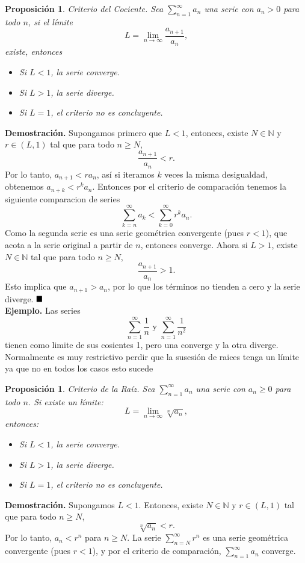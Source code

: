 \documentclass[letterpaper]{book}
\newtheorem{prop}[teorema]{Proposici\'on}
\newcommand{\eje}{{\noindent \sc \textbf{Ejemplo. }}}
\newcommand{\dem}{{\noindent \sc \textbf{Demostraci\'on. }}}
\newcommand{\QED}{\ensuremath{\hspace*{0em plus 1fill}\blacksquare}}
\begin{document}
\begin{prop}{Criterio del Cociente.}
Sea \(\sum_{n=1}^\infty a_n\) una serie con \(a_n > 0\) para todo \(n\), si el límite
\[
L = \lim_{n \to \infty} \frac{a_{n+1}}{a_n},
\]
existe, entonces
\begin{itemize}
\item Si \(L < 1\), la serie converge.
\item Si \(L > 1\), la serie diverge.
\item Si \(L = 1\), el criterio no es concluyente.
\end{itemize}
\end{prop}
\dem Supongamos primero que \(L < 1\), entonces, existe \(N \in \mathbb{N}\) y \(r \in (L, 1)\) tal que para todo \(n \geq N\),
\[
\frac{a_{n+1}}{a_n} < r.
\]
Por lo tanto, \(a_{n+1} < r a_n\), así si iteramos \(k\) veces la misma desigualdad, obtenemos \(a_{n+k} < r^k a_n\).
Entonces por el criterio de comparación tenemos la siguiente  comparacion de series
\[
    \sum_{k=n}^\infty a_k<\sum_{k=0}^\infty r^k a_n.
    \]
Como la segunda serie es una serie geométrica convergente (pues \(r < 1\)), que acota a la serie original a partir de \(n\), entonces converge.
Ahora si \(L > 1\), existe \(N \in \mathbb{N}\) tal que para todo \(n \geq N\),
\[
\frac{a_{n+1}}{a_n} > 1.
\]
Esto implica que \(a_{n+1} > a_n\), por lo que los términos no tienden a cero y la serie diverge.
\QED\\
\eje Las series
\[
\sum_{n=1}^{\infty}\frac{1}{n}\text{ y }\sum_{n=1}^{\infty}\frac{1}{n^2}
\]
tienen como limite de sus cosientes 1, pero una converge y la otra diverge.
Normalmente es muy restrictivo perdir que la susesión de raices tenga un límite ya que no en todos los casos esto sucede
\begin{prop}{Criterio de la Raíz.}
Sea \(\sum_{n=1}^\infty a_n\) una serie con \(a_n \geq 0\) para todo \(n\). Si existe un límite:
\[
L = \lim_{n \to \infty} \sqrt[n]{a_n},
\]
entonces:
\begin{itemize}
    \item Si \(L < 1\), la serie converge.
    \item Si \(L > 1\), la serie diverge.
    \item Si \(L = 1\), el criterio no es concluyente.
\end{itemize}
\end{prop}
\dem Supongamos \(L < 1\). Entonces, existe \(N \in \mathbb{N}\) y \(r \in (L, 1)\) tal que para todo \(n \geq N\),
\[
\sqrt[n]{a_n} < r.
\]
Por lo tanto, \(a_n < r^n\) para \(n \geq N\). La serie \(\sum_{n=N}^\infty r^n\) es una serie geométrica convergente (pues \(r < 1\)), y por el criterio de comparación, \(\sum_{n=1}^\infty a_n\) converge.
\end{document}
